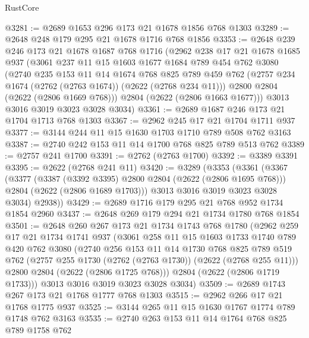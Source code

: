 \begin{lexlean}{RustCore}
\begin{coremodule}
@3281 := @2689 @1653 @296 @173 @21 @1678 @1856 @768 @1303
@3289 := @2648 @248 @179 @295 @21 @1678 @1716 @768 @1856
@3353 := @2648
    @239
    @246
    @173
    @21
    @1678
    @1687
    @768
    @1716
    (@2962
      @238
      @17
      @21
      @1678
      @1685
      @937
      (@3061
        @237
        @11
        @15
        @1603
        @1677
        @1684
        @789
        @454
        @762
        @3080
        (@2740
          @235
          @153
          @11
          @14
          @1674
          @768
          @825
          @789
          @459
          @762
          (@2757 @234 @1674 (@2762 (@2763 @1674)) (@2622 (@2768 @234 @11)))
          @2800
          @2804
          (@2622 (@2806 @1669 @768)))
        @2804
        (@2622 (@2806 @1663 @1677)))
      @3013
      @3016
      @3019
      @3023
      @3028
      @3034)
@3361 := @2689 @1687 @246 @173 @21 @1704 @1713 @768 @1303
@3367 := @2962 @245 @17 @21 @1704 @1711 @937
@3377 := @3144 @244 @11 @15 @1630 @1703 @1710 @789 @508 @762 @3163
@3387 := @2740 @242 @153 @11 @14 @1700 @768 @825 @789 @513 @762
@3389 := @2757 @241 @1700
@3391 := @2762 (@2763 @1700)
@3392 := @3389 @3391
@3395 := @2622 (@2768 @241 @11)
@3420 := @3289
    (@3353
      (@3361
        (@3367
          (@3377
            (@3387 (@3392 @3395) @2800 @2804 (@2622 (@2806 @1695 @768)))
            @2804
            (@2622 (@2806 @1689 @1703)))
          @3013
          @3016
          @3019
          @3023
          @3028
          @3034)
        @2938))
@3429 := @2689 @1716 @179 @295 @21 @768 @952 @1734 @1854 @2960
@3437 := @2648 @269 @179 @294 @21 @1734 @1780 @768 @1854
@3501 := @2648
    @260
    @267
    @173
    @21
    @1734
    @1743
    @768
    @1780
    (@2962
      @259
      @17
      @21
      @1734
      @1741
      @937
      (@3061
        @258
        @11
        @15
        @1603
        @1733
        @1740
        @789
        @420
        @762
        @3080
        (@2740
          @256
          @153
          @11
          @14
          @1730
          @768
          @825
          @789
          @519
          @762
          (@2757 @255 @1730 (@2762 (@2763 @1730)) (@2622 (@2768 @255 @11)))
          @2800
          @2804
          (@2622 (@2806 @1725 @768)))
        @2804
        (@2622 (@2806 @1719 @1733)))
      @3013
      @3016
      @3019
      @3023
      @3028
      @3034)
@3509 := @2689 @1743 @267 @173 @21 @1768 @1777 @768 @1303
@3515 := @2962 @266 @17 @21 @1768 @1775 @937
@3525 := @3144 @265 @11 @15 @1630 @1767 @1774 @789 @1748 @762 @3163
@3535 := @2740 @263 @153 @11 @14 @1764 @768 @825 @789 @1758 @762

\end{coremodule}
\end{lexlean}
